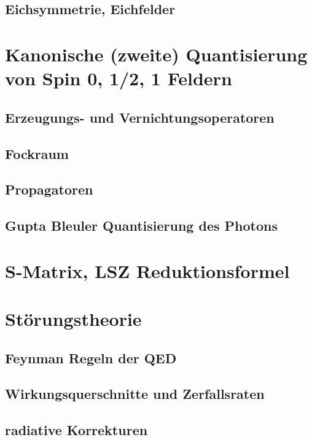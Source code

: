 \documentclass{include/thesisclass}
\begin{document}
\section{Eichsymmetrie, Eichfelder}

\chapter{Kanonische (zweite) Quantisierung von Spin 0, 1/2, 1 Feldern}
\section{Erzeugungs- und Vernichtungsoperatoren}
\section{Fockraum}
\section{Propagatoren}
\section{Gupta Bleuler Quantisierung des Photons}

\chapter{S-Matrix, LSZ Reduktionsformel}

\chapter{Störungstheorie}	
\section{Feynman Regeln der QED}
\section{Wirkungsquerschnitte und Zerfallsraten}
\section{radiative Korrekturen}
\end{document}
